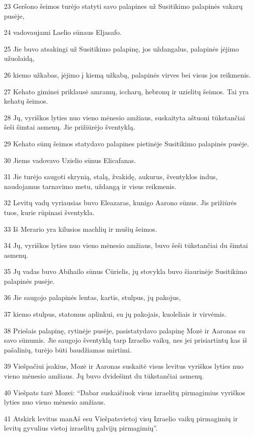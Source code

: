 \par 23 Geršono šeimos turėjo statyti savo palapines už Susitikimo palapinės vakarų pusėje, 
\par 24 vadovaujami Laelio sūnaus Eljasafo. 
\par 25 Jie buvo atsakingi už Susitikimo palapinę, jos uždangalus, palapinės įėjimo užuolaidą, 
\par 26 kiemo užkabas, įėjimo į kiemą užkabą, palapinės virves bei visus jos reikmenis. 
\par 27 Kehato giminei priklausė amramų, iccharų, hebronų ir uzielitų šeimos. Tai yra kehatų šeimos. 
\par 28 Jų, vyriškos lyties nuo vieno mėnesio amžiaus, suskaityta aštuoni tūkstančiai šeši šimtai asmenų. Jie prižiūrėjo šventyklą. 
\par 29 Kehato sūnų šeimos statydavo palapines pietinėje Susitikimo palapinės pusėje. 
\par 30 Jiems vadovavo Uzielio sūnus Elicafanas. 
\par 31 Jie turėjo saugoti skrynią, stalą, žvakidę, aukurus, šventyklos indus, naudojamus tarnavimo metu, uždangą ir visus reikmenis. 
\par 32 Levitų vadų vyriausias buvo Eleazaras, kunigo Aarono sūnus. Jis prižiūrės tuos, kurie rūpinasi šventykla. 
\par 33 Iš Merario yra kilusios machlių ir mušių šeimos. 
\par 34 Jų, vyriškos lyties nuo vieno mėnesio amžiaus, buvo šeši tūkstančiai du šimtai asmenų. 
\par 35 Jų vadas buvo Abihailo sūnus Cūrielis, jų stovykla buvo šiaurinėje Susitikimo palapinės pusėje. 
\par 36 Jie saugojo palapinės lentas, kartis, stulpus, jų pakojus, 
\par 37 kiemo stulpus, statomus aplinkui, su jų pakojais, kuoleliais ir virvėmis. 
\par 38 Priešais palapinę, rytinėje pusėje, pasistatydavo palapinę Mozė ir Aaronas su savo sūnumis. Jie saugojo šventyklą tarp Izraelio vaikų, nes jei prisiartintų kas iš pašalinių, turėjo būti baudžiamas mirtimi. 
\par 39 Viešpačiui įsakius, Mozė ir Aaronas suskaitė visus levitus vyriškos lyties nuo vieno mėnesio amžiaus. Jų buvo dvidešimt du tūkstančiai asmenų. 
\par 40 Viešpats tarė Mozei: “Dabar suskaičiuok visus izraelitų pirmagimius vyriškos lyties nuo vieno mėnesio amžiaus. 
\par 41 Atskirk levitus man­Aš esu Viešpats­vietoj visų Izraelio vaikų pirmagimių ir levitų gyvulius vietoj izraelitų galvijų pirmagimių”. 
